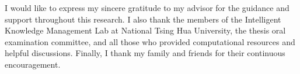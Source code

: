 
I would like to express my sincere gratitude to my advisor for the guidance and support throughout this research. I also thank the members of the Intelligent Knowledge Management Lab at National Tsing Hua University, the thesis oral examination committee, and all those who provided computational resources and helpful discussions. Finally, I thank my family and friends for their continuous encouragement.
